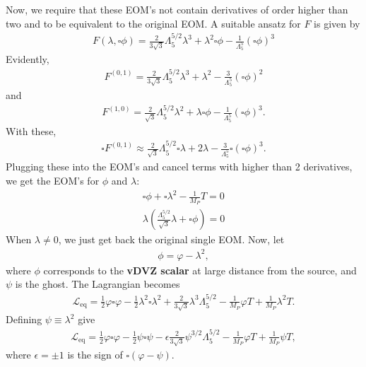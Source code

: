 \documentclass{book}
\theoremstyle{definition}
\newcommand{\lag}{\mathcal{L}}
\newcommand{\f}[2]{\frac{#1}{#2}}
\newcommand{\lp}{\left(}
\newcommand{\rp}{\right)}
\begin{document}
\begin{framed}
	Now, we require that these EOM's not contain derivatives of order higher than two and to be equivalent to the original EOM. A suitable ansatz for $F$ is given by
	\begin{align}
	\boxed{F(\lambda,\square \phi) = \f{2}{3\sqrt{3}} \Lambda_5^{5/2} \lambda^3 + \lambda^2 \square \phi - \f{1}{\Lambda_5^5}(\square \phi)^3}
	\end{align} 
	Evidently,
	\begin{align}
	F^{(0,1)} =  \f{2}{3\sqrt{3}} \Lambda_5^{5/2} \lambda^3 + \lambda^2  - \f{3}{\Lambda_5^5}(\square \phi)^2
	\end{align}
	and
	\begin{align}
	F^{(1,0)} = \f{2}{\sqrt{3}} \Lambda_5^{5/2} \lambda^2 + \lambda \square \phi - \f{1}{\Lambda_5^5}(\square \phi)^3.
	\end{align}
	With these,
	\begin{align}
	\square F^{(0,1)} \approx  \f{2}{\sqrt{3}} \Lambda_5^{5/2} \square \lambda + 2\lambda - \f{3}{\Lambda_5^5}\square (\square \phi)^3.
	\end{align}
	Plugging these into the EOM's and cancel terms with higher than 2 derivatives, we get the EOM's for $\phi$ and $\lambda$:
	\begin{align}
	\boxed{\square \phi + \square \lambda^2 - \f{1}{M_P}T = 0}\\
	\boxed{\lambda \lp \f{\Lambda_5^{5/2}}{\sqrt{3}}\lambda + \square \phi \rp = 0}
	\end{align}
	When $\lambda \neq 0$, we just get back the original single EOM. Now, let
	\begin{align}
	\phi = \varphi - \lambda^2,
	\end{align}
	where $\phi$ corresponds to the \textbf{vDVZ scalar} at large distance from the source, and $\psi$ is the ghost. The Lagrangian becomes
	\begin{align}
	\lag_{\text{eq}} = \f{1}{2}\varphi \square \varphi - \f{1}{2}\lambda^2 \square \lambda^2 + \f{2}{3\sqrt{3}} \lambda^3 \Lambda_5^{5/2} - \f{1}{M_P}\varphi T + \f{1}{M_P}\lambda^2 T.
	\end{align}
	Defining $\psi \equiv \lambda^2$ give
	\begin{align}
	\lag_{\text{eq}} = \f{1}{2}\varphi \square \varphi - \f{1}{2}\psi \square \psi - \epsilon \f{2}{3\sqrt{3}} \psi^{3/2}\Lambda_5^{5/2} - \f{1}{M_P}\varphi T + \f{1}{M_P}\psi T,
	\end{align}
	where $\epsilon = \pm 1$ is the sign of $\square (\varphi - \psi)$. \\
	

\end{framed}
\end{document}
